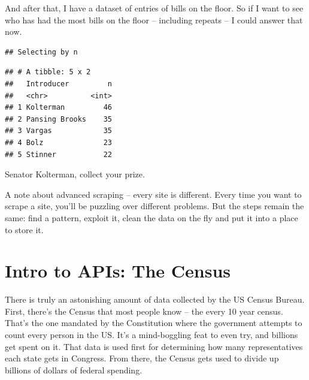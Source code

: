 \documentclass[]{book}
\newenvironment{Shaded}{\begin{snugshade}}{\end{snugshade}}
\newcommand{\DataTypeTok}[1]{\textcolor[rgb]{0.13,0.29,0.53}{#1}}
\newcommand{\DecValTok}[1]{\textcolor[rgb]{0.00,0.00,0.81}{#1}}
\newcommand{\KeywordTok}[1]{\textcolor[rgb]{0.13,0.29,0.53}{\textbf{#1}}}
\newcommand{\NormalTok}[1]{#1}
\newcommand{\OperatorTok}[1]{\textcolor[rgb]{0.81,0.36,0.00}{\textbf{#1}}}
\newcommand{\OtherTok}[1]{\textcolor[rgb]{0.56,0.35,0.01}{#1}}
\newcommand{\StringTok}[1]{\textcolor[rgb]{0.31,0.60,0.02}{#1}}
\begin{document}
And after that, I have a dataset of entries of bills on the floor. So if I want to see who has had the most bills on the floor -- including repeats -- I could answer that now.

\begin{Shaded}
\end{Shaded}

\begin{verbatim}
## Selecting by n
\end{verbatim}

\begin{verbatim}
## # A tibble: 5 x 2
##   Introducer         n
##   <chr>          <int>
## 1 Kolterman         46
## 2 Pansing Brooks    35
## 3 Vargas            35
## 4 Bolz              23
## 5 Stinner           22
\end{verbatim}

Senator Kolterman, collect your prize.

A note about advanced scraping -- every site is different. Every time you want to scrape a site, you'll be puzzling over different problems. But the steps remain the same: find a pattern, exploit it, clean the data on the fly and put it into a place to store it.

\hypertarget{intro-to-apis-the-census}{%
\chapter{Intro to APIs: The Census}\label{intro-to-apis-the-census}}

There is truly an astonishing amount of data collected by the US Census Bureau. First, there's the Census that most people know -- the every 10 year census. That's the one mandated by the Constitution where the government attempts to count every person in the US. It's a mind-boggling feat to even try, and billions get spent on it. That data is used first for determining how many representatives each state gets in Congress. From there, the Census gets used to divide up billions of dollars of federal spending.
\end{document}
